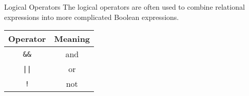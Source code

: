 \documentclass[../lecture3-flowofcontrol.tex]{subfiles}
\begin{document}
\begin{frame}[fragile]{Logical Operators}
    The logical operators are often used to combine relational expressions into more complicated Boolean expressions. \newline

    \begin{table}
        \center
        \begin{tabular}{c|c}
            \toprule
            \textbf{Operator} & \textbf{Meaning} \\
            \midrule
            \verb|&&| & and \\
            \verb+||+ & or \\
            \verb|!|  & not \\
            \bottomrule
        \end{tabular}
    \end{table}
\end{frame}
\end{document}
